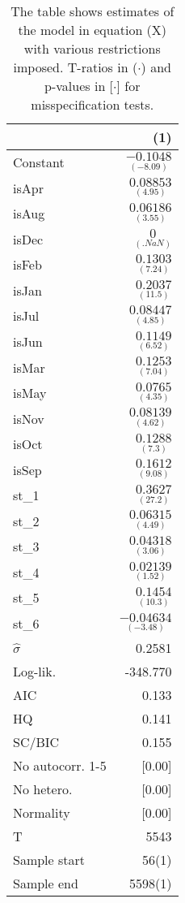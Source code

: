 
\begin{table}[tbph]
\begin{center}
\begin{tabular}{lr}
\hline
& (1) \\
\hline
Constant & $\underset{(-8.09)}{-0.1048}$ \\
isApr & $\underset{(4.95)}{0.08853}$ \\
isAug & $\underset{(3.55)}{0.06186}$ \\
isDec & $\underset{(.NaN)}{0}$ \\
isFeb & $\underset{(7.24)}{0.1303}$ \\
isJan & $\underset{(11.5)}{0.2037}$ \\
isJul & $\underset{(4.85)}{0.08447}$ \\
isJun & $\underset{(6.52)}{0.1149}$ \\
isMar & $\underset{(7.04)}{0.1253}$ \\
isMay & $\underset{(4.35)}{0.0765}$ \\
isNov & $\underset{(4.62)}{0.08139}$ \\
isOct & $\underset{(7.3)}{0.1288}$ \\
isSep & $\underset{(9.08)}{0.1612}$ \\
st\_1 & $\underset{(27.2)}{0.3627}$ \\
st\_2 & $\underset{(4.49)}{0.06315}$ \\
st\_3 & $\underset{(3.06)}{0.04318}$ \\
st\_4 & $\underset{(1.52)}{0.02139}$ \\
st\_5 & $\underset{(10.3)}{0.1454}$ \\
st\_6 & $\underset{(-3.48)}{-0.04634}$ \\
\hline
$\hat{\sigma}$ & 0.2581 \\
Log-lik. & -348.770 \\
\hline
AIC & 0.133 \\
HQ & 0.141 \\
SC/BIC & 0.155 \\
\hline
No autocorr. 1-5 & [0.00] \\
No hetero. & [0.00] \\
Normality & [0.00] \\
\hline
T & 5543 \\
Sample start & 56(1) \\
Sample end & 5598(1) \\
\hline
\end{tabular}
\end{center}
\vspace{1em}
\caption{The table shows estimates of the model in equation (X) with various restrictions imposed. T-ratios in ($\cdot$) and p-values in [$\cdot$] for misspecification tests.}
\end{table}
